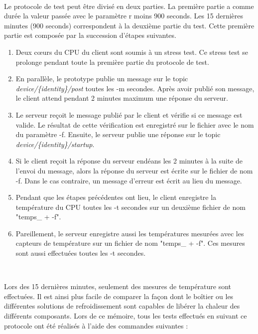 ~

\noindent
Le protocole de test peut être divisé en deux parties. La première partie a comme durée la valeur passée avec le paramètre r moins 900 seconds. Les 15 dernières minutes (900 seconds) correspondent à la deuxième partie du test. Cette première partie est composée par la succession d'étapes suivantes.

\begin{enumerate}
  \item Deux cœurs du CPU du client sont soumis à un stress test. Ce stress test se prolonge pendant toute la première partie du protocole de test.
  \item En parallèle, le prototype publie un message sur le topic \textit{device/\{identity\}/post} toutes les -m secondes. Après avoir publié son message, le client attend pendant 2 minutes maximum une réponse du serveur.
  \item Le serveur reçoit le message publié par le client et vérifie si ce message est valide. Le résultat de cette vérification est enregistré sur le fichier avec le nom du paramètre -f. Ensuite, le serveur publie une réponse sur le topic \textit{device/\{identity\}/startup}.

  \item Si le client reçoit la réponse du serveur endéans les 2 minutes à la suite de l'envoi du message, alors la réponse du serveur est écrite sur le fichier de nom -f. Dans le cas contraire, un message d'erreur est écrit au lieu du message.

  \item Pendant que les étapes précédentes ont lieu, le client enregistre la température du CPU toutes les -t secondes sur un deuxième fichier de nom "temps\_ + -f".

  \item Pareillement, le serveur enregistre aussi les températures mesurées avec les capteurs de température sur un fichier de nom "temps\_ + -f". Ces mesures sont aussi effectuées toutes les -t secondes.
\end{enumerate}

~

\noindent
Lors des 15 dernières minutes, seulement des mesures de température sont effectuées. Il est ainsi plus facile de comparer la façon dont le boîtier ou les différentes solutions de refroidissement sont capables de libérer la chaleur des différents composants.
Lors de ce mémoire, tous les tests effectués en suivant ce protocole ont été réalisés à l'aide des commandes suivantes :

